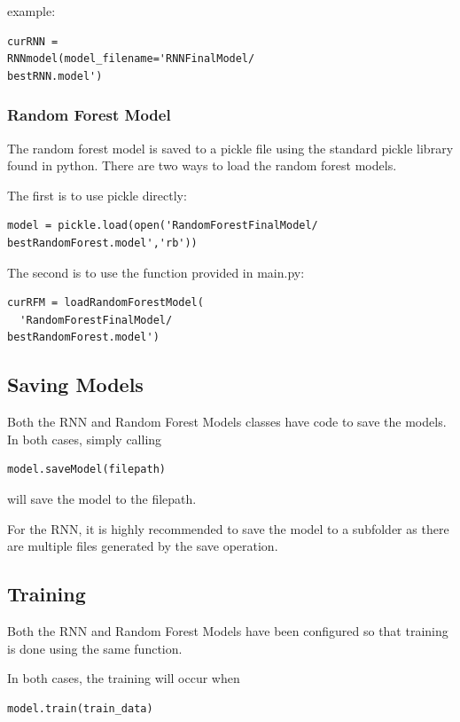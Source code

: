 \documentclass[twoside,twocolumn]{article}
\begin{document}
example:
\begin{lstlisting}
curRNN = 
RNNmodel(model_filename='RNNFinalModel/
bestRNN.model')
\end{lstlisting}

\subsubsection{Random Forest Model}

The random forest model is saved to a pickle file using the standard pickle library found in python.
There are two ways to load the random forest models.

The first is to use pickle directly:
\begin{lstlisting}
model = pickle.load(open('RandomForestFinalModel/
bestRandomForest.model','rb'))
\end{lstlisting}

The second is to use the function provided in main.py:
\begin{lstlisting}
curRFM = loadRandomForestModel(
  'RandomForestFinalModel/
bestRandomForest.model')
\end{lstlisting}

\subsection{Saving Models}

Both the RNN and Random Forest Models classes have code to save the models. In both cases,
simply calling

\begin{lstlisting}
model.saveModel(filepath)
\end{lstlisting}

will save the model to the filepath.

For the RNN, it is highly recommended to save the model to a subfolder as there are multiple files
generated by the save operation.


\subsection{Training}

Both the RNN and Random Forest Models have been configured so that training is done using the same function.

In both cases, the training will occur when

\begin{lstlisting}
model.train(train_data)
\end{lstlisting}
\end{document}
